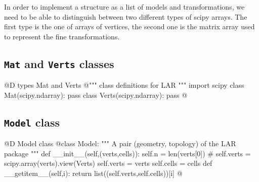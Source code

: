 \documentclass[11pt,oneside]{article}    %
\begin{document}
In order to implement a structure as a list of models and transformations, we need to be able to distinguish between two different types of scipy arrays. The first type is the one of arrays of vertices, the second one is the matrix array used to represent the fine transformations.

\subsection{\texttt{Mat} and \texttt{Verts} classes}
@D types Mat and Verts
@{""" class definitions for LAR """
import scipy
class Mat(scipy.ndarray): pass
class Verts(scipy.ndarray): pass
@}

\subsection{\texttt{Model} class}
@D Model class
@{class Model:
    """ A pair (geometry, topology) of the LAR package """
    def __init__(self,(verts,cells)):
        self.n = len(verts[0])
        # self.verts = scipy.array(verts).view(Verts)
        self.verts = verts
        self.cells = cells
    def __getitem__(self,i):
        return list((self.verts,self.cells))[i]
@}
\end{document}
